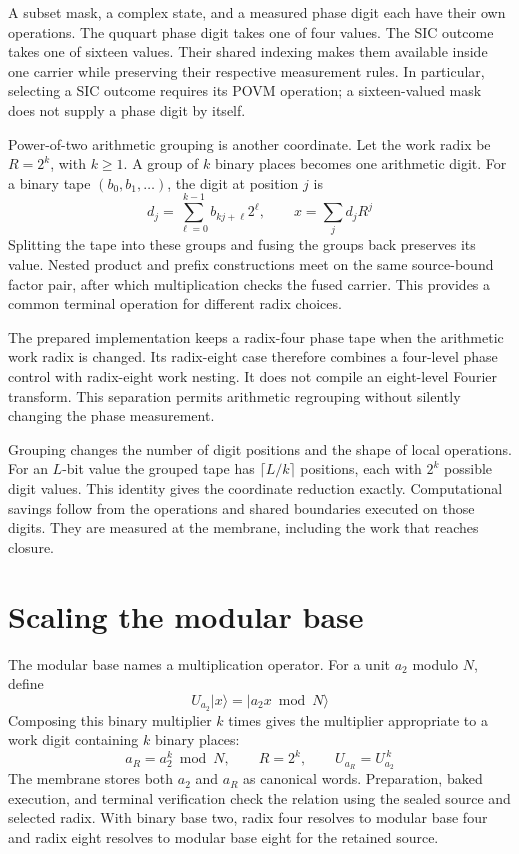 \documentclass[12pt]{article}
\newcommand{\ket}[1]{\lvert #1\rangle}
\begin{document}
A subset mask, a complex state, and a measured phase digit each have their own operations. The ququart phase digit takes one of four values. The SIC outcome takes one of sixteen values. Their shared indexing makes them available inside one carrier while preserving their respective measurement rules. In particular, selecting a SIC outcome requires its POVM operation; a sixteen-valued mask does not supply a phase digit by itself.

Power-of-two arithmetic grouping is another coordinate. Let the work radix be $R=2^k$, with $k\geq1$. A group of $k$ binary places becomes one arithmetic digit. For a binary tape $(b_0,b_1,\ldots)$, the digit at position $j$ is
\[
d_j=\sum_{\ell=0}^{k-1}b_{kj+\ell}2^\ell,
\qquad
x=\sum_j d_jR^j
\]
Splitting the tape into these groups and fusing the groups back preserves its value. Nested product and prefix constructions meet on the same source-bound factor pair, after which multiplication checks the fused carrier. This provides a common terminal operation for different radix choices.

The prepared implementation keeps a radix-four phase tape when the arithmetic work radix is changed. Its radix-eight case therefore combines a four-level phase control with radix-eight work nesting. It does not compile an eight-level Fourier transform. This separation permits arithmetic regrouping without silently changing the phase measurement.

Grouping changes the number of digit positions and the shape of local operations. For an $L$-bit value the grouped tape has $\lceil L/k\rceil$ positions, each with $2^k$ possible digit values. This identity gives the coordinate reduction exactly. Computational savings follow from the operations and shared boundaries executed on those digits. They are measured at the membrane, including the work that reaches closure.

\section*{Scaling the modular base}

The modular base names a multiplication operator. For a unit $a_2$ modulo $N$, define
\[
U_{a_2}\ket{x}=\ket{a_2x\bmod N}
\]
Composing this binary multiplier $k$ times gives the multiplier appropriate to a work digit containing $k$ binary places:
\[
a_R=a_2^k\bmod N,\qquad R=2^k,
\qquad U_{a_R}=U_{a_2}^{\,k}
\]
The membrane stores both $a_2$ and $a_R$ as canonical words. Preparation, baked execution, and terminal verification check the relation using the sealed source and selected radix. With binary base two, radix four resolves to modular base four and radix eight resolves to modular base eight for the retained source.
\end{document}
